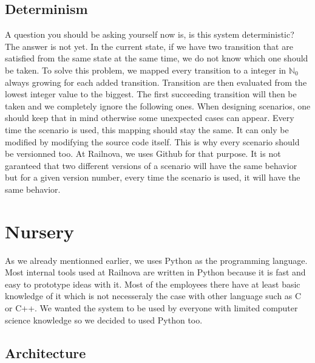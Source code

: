 \documentclass[12pt]{article}
\theoremstyle{definition}
\theoremstyle{definition}
\theoremstyle{remark}
\begin{document}
\subsection{Determinism}

A question you should be asking yourself now is, is this system deterministic? The answer is not yet. In the current state, if we have two transition that are satisfied from the same state at the same time, we do not know which one should be taken. To solve this problem, we mapped every transition to a integer in $\mathbb{N}_0$ always growing for each added transition. Transition are then evaluated from the lowest integer value to the biggest. The first succeeding transition will then be taken and we completely ignore the following ones. When designing scenarios, one should keep that in mind otherwise some unexpected cases can appear. Every time the scenario is used, this mapping should stay the same. It can only be modified by modifying the source code itself. This is why every scenario should be versionned too. At Railnova, we uses Github for that purpose. It is not garanteed that two different versions of a scenario will have the same behavior but for a given version number, every time the scenario is used, it will have the same behavior.



\section{Nursery}


As we already mentionned earlier, we uses Python as the programming language. Most internal tools used at Railnova are written in Python because it is fast and easy to prototype ideas with it. Most of the employees there have at least basic knowledge of it which is not necesseraly the case with other language such as C or C++. We wanted the system to be used by everyone with limited computer science knowledge so we decided to used Python too.


\subsection{Architecture}
\end{document}
